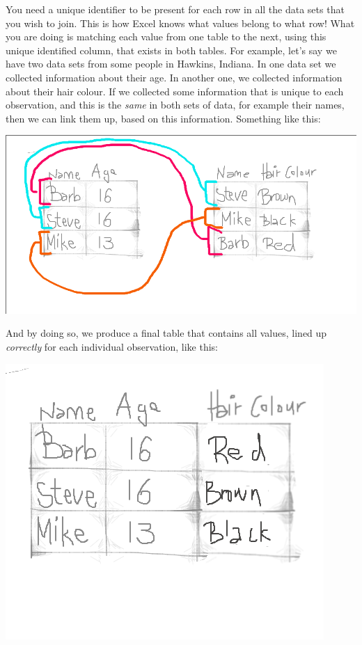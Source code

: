 \documentclass[
]{book}
\begin{document}
You need a unique identifier to be present for each row in all the data sets that you wish to join. This is how Excel knows what values belong to what row! What you are doing is matching each value from one table to the next, using this unique identified column, that exists in both tables. For example, let's say we have two data sets from some people in Hawkins, Indiana. In one data set we collected information about their age. In another one, we collected information about their hair colour. If we collected some information that is unique to each observation, and this is the \emph{same} in both sets of data, for example their names, then we can link them up, based on this information. Something like this:

\includegraphics{imgs/merge_logic_1.png}

And by doing so, we produce a final table that contains all values, lined up \emph{correctly} for each individual observation, like this:

\includegraphics{imgs/merge_logic_2.png}
\end{document}
